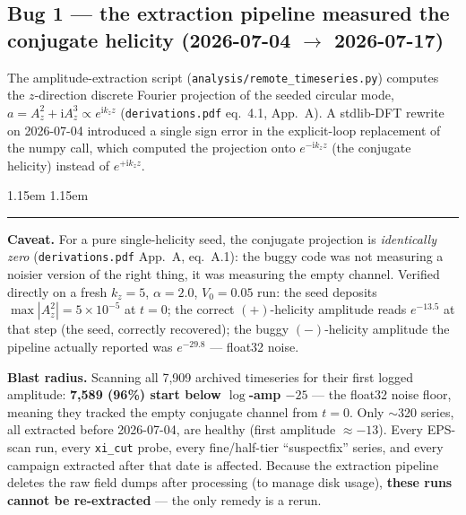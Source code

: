 \documentclass[11pt,a4paper]{article}
\numberwithin{equation}{section}
\theoremstyle{remark}
\newenvironment{caveat}%
{\par\medskip\noindent
 \begin{list}{}{\leftmargin 1.15em \rightmargin 1.15em \listparindent 0pt
 \itemindent 0pt \parsep 2pt \topsep 2pt}\item\relax
 \small\textcolor{red!55!black}{\rule[-0.6ex]{2.6pt}{2.4ex}}\hspace{0.55em}%
 \textcolor{red!55!black}{\textbf{Caveat.}}\hspace{0.5em}\ignorespaces}%
{\end{list}\medskip}
\newcommand{\Vo}{V_0}
\newcommand{\kz}{k_z}
\newcommand{\ii}{\mathrm{i}}
\begin{document}
\subsection{Bug 1 --- the extraction pipeline measured the conjugate
helicity (2026-07-04 $\to$ 2026-07-17)}
\label{ssec:helicitybug}

The amplitude-extraction script (\texttt{analysis/remote\_timeseries.py})
computes the $z$-direction discrete Fourier projection of the seeded
circular mode, $a=A_z^2+\ii A_z^3\propto e^{\ii\kz z}$
(\texttt{derivations.pdf} eq.~4.1, App.~A). A stdlib-DFT rewrite on
2026-07-04 introduced a single sign error in the explicit-loop
replacement of the numpy call, which computed the projection onto
$e^{-\ii\kz z}$ (the conjugate helicity) instead of $e^{+\ii\kz z}$.

\begin{caveat}
For a pure single-helicity seed, the conjugate projection is
\emph{identically zero} (\texttt{derivations.pdf} App.~A, eq.~A.1): the
buggy code was not measuring a noisier version of the right thing, it was
measuring the empty channel. Verified directly on a fresh $\kz=5$,
$\alpha=2.0$, $\Vo=0.05$ run: the seed deposits $\max|A_z^2|=5\times10^{-5}$
at $t=0$; the correct $(+)$-helicity amplitude reads $e^{-13.5}$ at that
step (the seed, correctly recovered); the buggy $(-)$-helicity amplitude
the pipeline actually reported was $e^{-29.8}$ --- float32 noise.
\end{caveat}

\textbf{Blast radius.} Scanning all 7,909 archived timeseries for their
first logged amplitude: \textbf{7,589 (96\%) start below $\log$-amp
$-25$} --- the float32 noise floor, meaning they tracked the empty
conjugate channel from $t=0$. Only $\sim$320 series, all extracted before
2026-07-04, are healthy (first amplitude $\approx-13$). Every EPS-scan
run, every \texttt{xi\_cut} probe, every fine/half-tier ``suspectfix''
series, and every campaign extracted after that date is affected. Because
the extraction pipeline deletes the raw field dumps after processing (to
manage disk usage), \textbf{these runs cannot be re-extracted} --- the
only remedy is a rerun.
\end{document}
